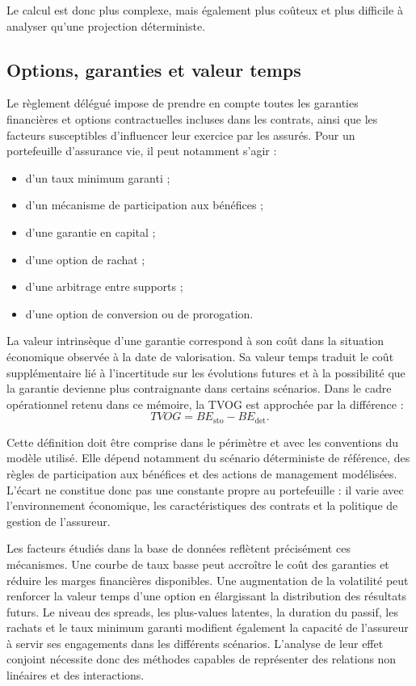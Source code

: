 Le calcul est donc plus complexe, mais également plus coûteux et plus difficile à
analyser qu'une projection déterministe.

\subsection{Options, garanties et valeur temps}

Le règlement délégué impose de prendre en compte toutes les garanties
financières et options contractuelles incluses dans les contrats, ainsi que les
facteurs susceptibles d'influencer leur exercice par les assurés. Pour un portefeuille d'assurance vie, il peut
notamment s'agir :

\begin{itemize}
    \item d'un taux minimum garanti ;
    \item d'un mécanisme de participation aux bénéfices ;
    \item d'une garantie en capital ;
    \item d'une option de rachat ;
    \item d'une arbitrage entre supports ;
    \item d'une option de conversion ou de prorogation.
\end{itemize}

La valeur intrinsèque d'une garantie correspond à son coût dans la situation
économique observée à la date de valorisation. Sa valeur temps traduit le coût
supplémentaire lié à l'incertitude sur les évolutions futures et à la
possibilité que la garantie devienne plus contraignante dans certains
scénarios. Dans le cadre opérationnel retenu dans ce mémoire, la TVOG est
approchée par la différence :
\[
    TVOG =
    BE_{\mathrm{sto}}-BE_{\mathrm{det}}.
\]

Cette définition doit être comprise dans le périmètre et avec les conventions
du modèle utilisé. Elle dépend notamment du scénario déterministe de référence,
des règles de participation aux bénéfices et des actions de management
modélisées. L'écart ne constitue donc pas une constante propre au portefeuille :
il varie avec l'environnement économique, les caractéristiques des contrats et
la politique de gestion de l'assureur.

Les facteurs étudiés dans la base de données reflètent précisément ces
mécanismes. Une courbe de taux basse peut accroître le coût des garanties et
réduire les marges financières disponibles. Une augmentation de la volatilité
peut renforcer la valeur temps d'une option en élargissant la distribution des
résultats futurs. Le niveau des spreads, les plus-values latentes, la duration
du passif, les rachats et le taux minimum garanti modifient également la
capacité de l'assureur à servir ses engagements dans les différents scénarios.
L'analyse de leur effet conjoint nécessite donc des méthodes capables de
représenter des relations non linéaires et des interactions.

